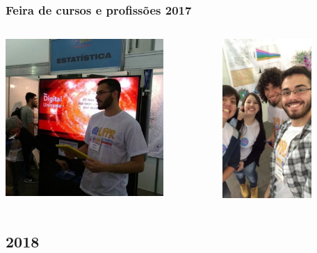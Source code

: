 \documentclass[10pt,
  aspectratio=169,
  serif,
  mathserif,
  professionalfont,
  compress,
  handout,
  ]{beamer}\usepackage[]{graphicx}\usepackage[]{color}
\begin{document}
\begin{frame}

\frametitle{Feira de cursos e profissões 2017}

\begin{columns}

\begin{column}{0.7\textwidth}

\begin{center}
     \includegraphics[width=6cm]{img/feira3.jpeg}
     \end{center}
  
\end{column}

\begin{column}{0.3\textwidth}  %

    \begin{center}
     \includegraphics[width=3.4cm]{img/feira4.png}
     \end{center}

\end{column}

\end{columns}

\end{frame}


\subsection{2018}
\end{document}

